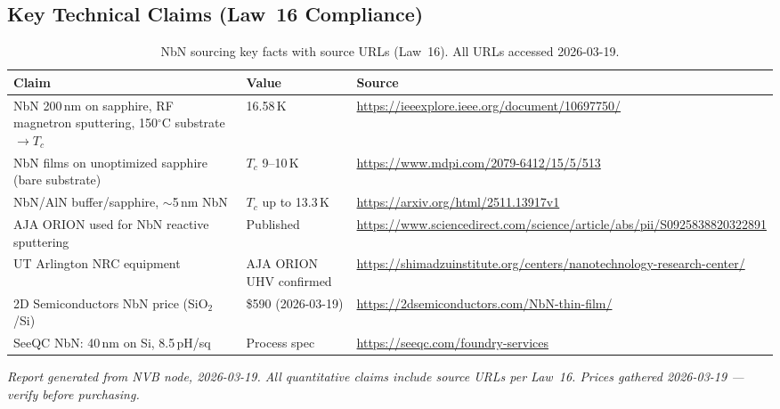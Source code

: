 \subsection{Key Technical Claims (Law~16 Compliance)}
\label{sec:nbn_claims}

\begin{table}[ht]
\centering
\caption{NbN sourcing key facts with source URLs (Law~16).
  All URLs accessed 2026-03-19.}
\label{tab:nbn_claims}
\small
\begin{tabular}{@{}p{5cm}p{2.5cm}p{6cm}@{}}
\toprule
Claim & Value & Source \\
\midrule
NbN 200\,nm on sapphire, RF magnetron sputtering, 150$^\circ$C substrate $\to T_c$ &
  16.58\,K & \url{https://ieeexplore.ieee.org/document/10697750/} \\
NbN films on unoptimized sapphire (bare substrate) &
  $T_c$ 9--10\,K & \url{https://www.mdpi.com/2079-6412/15/5/513} \\
NbN/AlN buffer/sapphire, $\sim$5\,nm NbN &
  $T_c$ up to 13.3\,K & \url{https://arxiv.org/html/2511.13917v1} \\
AJA ORION used for NbN reactive sputtering &
  Published & \url{https://www.sciencedirect.com/science/article/abs/pii/S0925838820322891} \\
UT Arlington NRC equipment & AJA ORION UHV confirmed &
  \url{https://shimadzuinstitute.org/centers/nanotechnology-research-center/} \\
2D Semiconductors NbN price (SiO$_2$/Si) &
  \$590 (2026-03-19) & \url{https://2dsemiconductors.com/NbN-thin-film/} \\
SeeQC NbN: 40\,nm on Si, 8.5\,pH/sq &
  Process spec & \url{https://seeqc.com/foundry-services} \\
\bottomrule
\end{tabular}
\end{table}

\textit{Report generated from NVB node, 2026-03-19. All quantitative claims include source URLs per Law~16.
Prices gathered 2026-03-19 --- verify before purchasing.}

